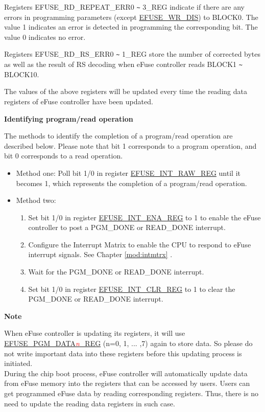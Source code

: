 \documentclass[main\_\_EN.tex]{subfiles}
\begin{document}
Registers EFUSE\_RD\_REPEAT\_ERR0 \verb+~+ 3\_REG indicate if there are any errors in programming parameters (except \hyperref[fielddesc:EFUSEWRDIS]{EFUSE\_WR\_DIS}) to BLOCK0. The value 1 indicates an error is detected in programming the corresponding bit. The value 0 indicates no error.

Registers EFUSE\_RD\_RS\_ERR0 \verb+~+ 1\_REG store the number of corrected bytes as well as the result of RS decoding when eFuse controller reads BLOCK1 \verb+~+ BLOCK10.

The values of the above registers will be updated every time the reading data registers of eFuse controller have been updated.

{\bfseries Identifying program/read operation}

The methods to identify the completion of a program/read operation are described below. Please note that bit 1 corresponds to a program operation, and bit 0 corresponds to a read operation.

\begin{itemize}
    \item Method one: Poll bit 1/0 in register \hyperref[regdesc:EFUSEINTRAWREG]{EFUSE\_INT\_RAW\_REG} until it becomes 1, which represents the completion of a program/read operation.
    \item Method two:
        \begin{enumerate}
            \item Set bit 1/0 in register \hyperref[regdesc:EFUSEINTENAREG]{EFUSE\_INT\_ENA\_REG} to 1 to enable the eFuse controller to post a PGM\_DONE or READ\_DONE interrupt.
            \item Configure the Interrupt Matrix to enable the CPU to respond to eFuse interrupt signals. See Chapter \ref{mod:intmtrx} \textit{}.
            \item Wait for the PGM\_DONE or READ\_DONE interrupt.
            \item Set bit 1/0 in register \hyperref[regdesc:EFUSEINTCLRREG]{EFUSE\_INT\_CLR\_REG} to 1 to clear the PGM\_DONE or READ\_DONE interrupt.
    \end{enumerate}
\end{itemize}

{\bfseries Note}

When eFuse controller is updating its registers, it will use \hyperref[regdesc:EFUSEPGMDATANREG]{EFUSE\_PGM\_DATA\textcolor{red}{\it{n}}\_REG} (n=0, 1, ... ,7) again to store data. So please do not write important data into these registers before this updating process is initiated. \\
During the chip boot process, eFuse controller will automatically update data from eFuse memory into the registers that can be accessed by users. Users can get programmed eFuse data by reading corresponding registers. Thus, there is no need to update the reading data registers in such case.
\end{document}
